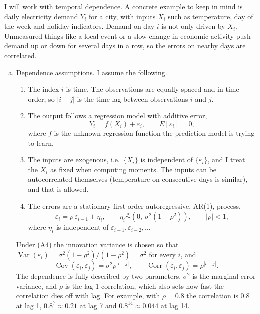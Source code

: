 \documentclass[12pt,letterpaper, onecolumn]{exam}
\begin{document}
\begin{questions}
    \newpage
    \begin{solution}

        I will work with temporal dependence. A concrete example to keep in mind is daily electricity demand $Y_i$ for a city, with inputs $X_i$ such as temperature, day of the week and holiday indicators. Demand on day $i$ is not only driven by $X_i$. Unmeasured things like a local event or a slow change in economic activity push demand up or down for several days in a row, so the errors on nearby days are correlated.

        \begin{enumerate}[(a)]
            \item Dependence assumptions. I assume the following.
            \begin{enumerate}[(A1)]
                \item The index $i$ is time. The observations are equally spaced and in time order, so $|i-j|$ is the time lag between observations $i$ and $j$.
                \item The output follows a regression model with additive error,
                \begin{equation*}
                    Y_i = f(X_i) + \varepsilon_i, \qquad E[\varepsilon_i]=0,
                \end{equation*}
                where $f$ is the unknown regression function the prediction model is trying to learn.
                \item The inputs are exogenous, i.e.\ $\{X_i\}$ is independent of $\{\varepsilon_i\}$, and I treat the $X_i$ as fixed when computing moments. The inputs can be autocorrelated themselves (temperature on consecutive days is similar), and that is allowed.
                \item The errors are a stationary first-order autoregressive, AR(1), process,
                \begin{equation*}
                    \varepsilon_i = \rho\,\varepsilon_{i-1} + \eta_i, \qquad \eta_i \overset{\text{iid}}{\sim} (0,\ \sigma^2(1-\rho^2)), \qquad |\rho|<1,
                \end{equation*}
                where $\eta_i$ is independent of $\varepsilon_{i-1},\varepsilon_{i-2},\dots$
            \end{enumerate}
            Under (A4) the innovation variance is chosen so that $\operatorname{Var}(\varepsilon_i) = \sigma^2(1-\rho^2)/(1-\rho^2) = \sigma^2$ for every $i$, and
            \begin{equation*}
                \operatorname{Cov}(\varepsilon_i,\varepsilon_j) = \sigma^2\rho^{|i-j|}, \qquad \operatorname{Corr}(\varepsilon_i,\varepsilon_j) = \rho^{|i-j|}.
            \end{equation*}
            The dependence is fully described by two parameters. $\sigma^2$ is the marginal error variance, and $\rho$ is the lag-1 correlation, which also sets how fast the correlation dies off with lag. For example, with $\rho = 0.8$ the correlation is $0.8$ at lag 1, $0.8^{7}\approx 0.21$ at lag 7 and $0.8^{14}\approx 0.044$ at lag 14.


\end{enumerate}
\end{solution}
\end{questions}
\end{document}
